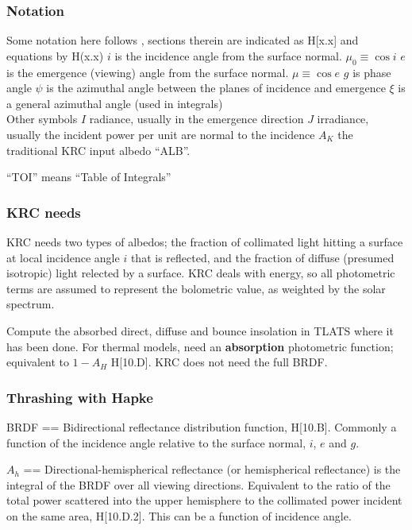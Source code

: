 
\subsubsection{Notation} %
Some notation here follows , sections therein are indicated as
H[x.x] and equations by H(x.x) 
\qi $i$ is the incidence angle from the surface normal. $\mu_0 \equiv \cos i$
\qi $e$ is the emergence (viewing) angle from the surface normal. $\mu \equiv \cos e$
\qi $g$ is phase angle
\qi $\psi$ is the azimuthal angle between the planes of incidence and emergence 
\qi $\xi$ is a general azimuthal angle (used in integrals)
\\ Other symbols
\qi $I$ radiance, usually in the emergence direction
\qi $J$ irradiance, usually the incident power per unit are normal to the incidence
\qi $A_K$ the traditional KRC input albedo ``ALB''.

 ``TOI'' means ``Table of Integrals'' 

\subsubsection{KRC needs} %

KRC needs two types of albedos; the fraction of collimated light hitting a
surface at local incidence angle $i$ that is reflected, and the fraction of
diffuse (presumed isotropic) light relected by a surface. KRC deals with energy,
so all photometric terms are assumed to represent the bolometric value, as
weighted by the solar spectrum.

Compute the absorbed direct, diffuse and bounce insolation in TLATS where it has
been done.  For thermal models, need an \textbf{absorption} photometric
function; equivalent to $1-A_H$ H[10.D].  KRC does not need the full BRDF.

\subsubsection{Thrashing with Hapke} %

BRDF == Bidirectional reflectance distribution function, H[10.B]. Commonly a
function of the incidence angle relative to the surface normal, $i$, $e$ and
$g$.

$A_h$ == Directional-hemispherical reflectance (or hemispherical reflectance) is
the integral of the BRDF over all viewing directions. Equivalent to the ratio of
the total power scattered into the upper hemisphere to the collimated power
incident on the same area, H[10.D.2]. This can be a function of incidence
angle.

